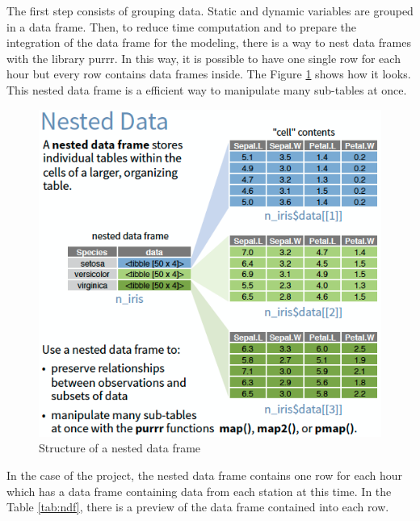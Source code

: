 \documentclass[12pt,twoside]{reedthesis}
\theoremstyle{definition}
\theoremstyle{definition}
\theoremstyle{definition}
\theoremstyle{remark}
\begin{document}
The first step consists of grouping data. Static and dynamic variables
are grouped in a data frame. Then, to reduce time computation and to
prepare the integration of the data frame for the modeling, there is a
way to nest data frames with the library purrr. In this way, it is
possible to have one single row for each hour but every row contains
data frames inside. The Figure \ref{fig:nested} shows how it looks. This
nested data frame is a efficient way to manipulate many sub-tables at
once.
\begin{figure}

{\centering \includegraphics[width=0.5\linewidth]{figure/purrr_nest} 

}

\caption{Structure of a nested data frame}\label{fig:nested}
\end{figure}
In the case of the project, the nested data frame contains one row for
each hour which has a data frame containing data from each station at
this time. In the Table \ref{tab:ndf}, there is a preview of the data
frame contained into each row.
\end{document}
